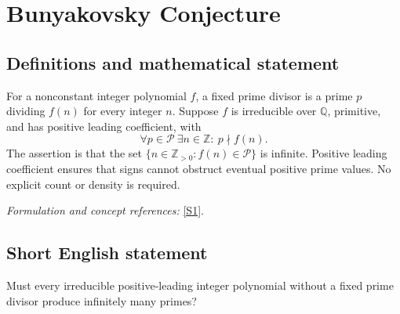 \documentclass[11pt]{article}
\newcommand{\Z}{\mathbb{Z}}
\newcommand{\Q}{\mathbb{Q}}
\newcommand{\sref}[2]{\hyperlink{source:#1:#2}{[S#2]}}
\newif\ifshowcatalogue
\newcommand{\cataloguescope}[1]{\ifshowcatalogue
 \paragraph{Exact scope in the supplied catalogue.}
 \begin{quote}\small #1\end{quote}\fi}
\begin{document}
\setcounter{section}{0}
\clearpage
\section*{\texorpdfstring{Bunyakovsky Conjecture}{Bunyakovsky Conjecture}}\label{1292}
\subsection{Definitions and mathematical statement}
For a nonconstant integer polynomial $f$, a fixed prime divisor is a prime $p$ dividing $f(n)$ for every integer $n$. Suppose $f$ is irreducible over $\Q$, primitive, and has positive leading coefficient, with
\[
 \forall p\in\mathcal P\ \exists n\in\Z:\ p\nmid f(n).
\]
The assertion is that the set $\{n\in\Z_{>0}:f(n)\in\mathcal P\}$ is infinite. Positive leading coefficient ensures that signs cannot obstruct eventual positive prime values. No explicit count or density is required.
\par\smallskip\textit{Formulation and concept references:} \sref{1292}{1}.
\cataloguescope{Prove or disprove that every irreducible polynomial f in Z[x] with positive leading coefficient and no fixed prime divisor takes prime values for infinitely many positive integer inputs.}
\subsection{Short English statement}
Must every irreducible positive-leading integer polynomial without a fixed prime divisor produce infinitely many primes?
\end{document}
